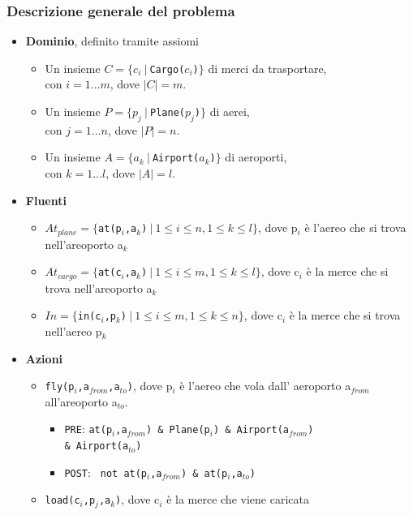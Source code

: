 \documentclass[a4paper,oneside,12pt]{book}
\begin{document}
	\subsubsection*{Descrizione generale del problema}
	\begin{itemize}
		\item \textbf{Dominio}, definito tramite assiomi
		\begin{itemize}
			\item Un insieme $C=\{c_i \ | \ $\texttt{Cargo($c_i$)}$\}$ di merci da trasportare,\\
			con $i=1 \dots m$, dove $|C|=m$.
			\item Un insieme $P=\{p_j \ | \ $\texttt{Plane($p_j$)}$\}$ di aerei,\\
			con $j=1 \dots n$, dove $|P|=n$.
			\item Un insieme $A=\{a_k \ | \ $\texttt{Airport($a_k$)}$\}$ di aeroporti,\\
			con $k=1 \dots l$, dove $|A|=l$.
		\end{itemize}
		\item \textbf{Fluenti}
		\begin{itemize}
			\item $At_{plane} = \{$\texttt{at(p$_i$,a$_k$)}$ \ | \ 1\leq i\leq n, 1 \leq k\leq l\}$,
			dove p$_i$ è l'aereo che si trova nell'areoporto a$_k$
			\item $At_{cargo}= \{$\texttt{at(c$_i$,a$_k$)}$  \ | \ 1\leq i\leq m, 1 \leq k\leq l\}$,
			dove c$_i$ è la merce che si trova nell'areoporto a$_k$
			\item $In= \{$\texttt{in(c$_i$,p$_k$)}$ \ | \ 1\leq i\leq m, 1 \leq k\leq n\}$,
			dove c$_i$ è la merce che si trova nell'aereo p$_k$
		\end{itemize}
		\item \textbf{Azioni}
		\begin{itemize}
			\item \texttt{fly(p$_i$,a$_{from}$,a$_{to}$)}, dove p$_i$ è l'aereo che vola dall'
			aeroporto a$_{from}$ all'areoporto a$_{to}$.
			\begin{itemize}
				\item \texttt{PRE}:
				\texttt{at(p$_i$,a$_{from}$) \& Plane(p$_i$) \& Airport(a$_{from}$)\\ \& Airport(a$_{to}$)}
				\item \texttt{POST}: \texttt{ not at(p$_i$,a$_{from}$) \& at(p$_i$,a$_{to}$)}
			\end{itemize}
			\item \texttt{load(c$_i$,p$_{j}$,a$_{k}$)}, dove c$_i$ è la merce che viene caricata

\end{itemize}
\end{itemize}
\end{document}
